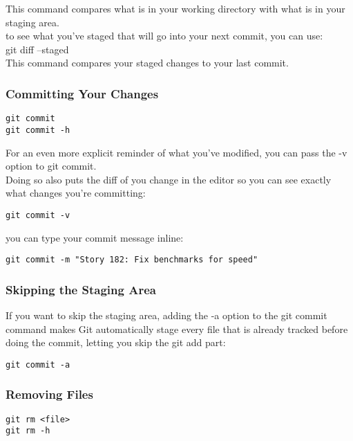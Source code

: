 \documentclass[11pt]{article}
\begin{document}
This command compares what is in your working directory with what is in your staging area.\\

to see what you've staged that will go into your next commit, you can use:\\
git diff --staged\\

This command compares your staged changes to your last commit.\\

\subsubsection{Committing Your Changes}
\label{sec:org561d2f8}
\begin{verbatim}
git commit
git commit -h
\end{verbatim}

For an even more explicit reminder of what you've modified, you can pass the -v option to git commit.\\
Doing so also puts the diff of you change in the editor so you can see exactly what changes you're committing:\\
\begin{verbatim}
git commit -v
\end{verbatim}

you can type your commit message inline:\\
\begin{verbatim}
git commit -m "Story 182: Fix benchmarks for speed"
\end{verbatim}


\subsubsection{Skipping the Staging Area}
\label{sec:orgdda6f58}
If you want to skip the staging area, adding the -a option to the git commit command makes Git automatically stage every file that is already tracked before doing the commit, letting you skip the git add part:\\
\begin{verbatim}
git commit -a
\end{verbatim}


\subsubsection{Removing Files}
\label{sec:org45f1de3}
\begin{verbatim}
git rm <file>
git rm -h
\end{verbatim}
\end{document}
